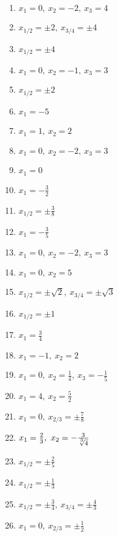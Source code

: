 \newpage
\begin{Answer}[ref=ganzNSTA1]\\
	\begin{minipage}{\textwidth}
		\begin{minipage}{0.49\textwidth}
			\begin{enumerate}[label=\alph*)]
				\item \(x_1=0,\ x_2=-2,\ x_3=4\)
				\item \(x_{1/2}=\pm 2,\ x_{3/4}=\pm 4\)
				\item \(x_{1/2}=\pm 4\)
				\item \(x_1=0,\ x_2=-1,\ x_3=3\)
				\item \(x_{1/2}=\pm 2\)
				\item \(x_1=-5\)
				\item \(x_1=1,\ x_2=2\)
				\item \(x_1=0,\ x_2=-2,\ x_3=3\)
				\item \(x_1=0\)
				\item \(x_1=-\frac{3}{2}\)
				\item \(x_{1/2}=\pm \frac{3}{8}\)
				\item \(x_1=-\frac{3}{5}\)
				\item \(x_1=0,\ x_2=-2,\ x_3=3\)
			\end{enumerate}
		\end{minipage}
		\begin{minipage}{0.49\textwidth}
			\begin{enumerate}[label=\alph*)]
				\setcounter{enumi}{13}
				\item \(x_1=0,\ x_2=5\)
				\item \(x_{1/2}=\pm \sqrt{2},\ x_{3/4}=\pm \sqrt{3}\)
				\item \(x_{1/2}=\pm 1\)
				\item \(x_1=\frac{3}{4}\)
				\item \(x_1=-1,\ x_2=2\)
				\item \(x_1=0,\ x_2=\frac{1}{4},\ x_3=-\frac{1}{5}\)
				\item \(x_1=4,\ x_2=\frac{5}{2}\)
				\item \(x_1=0,\ x_{2/3}=\pm \frac{7}{8}\)
				\item \(x_1=\frac{2}{3},\ x_2=-\frac{3}{\sqrt[\leftroot{0}\uproot{2}3]{4}}\)
				\item \(x_{1/2}=\pm\frac{2}{5}\)
				\item \(x_{1/2}=\pm\frac{1}{3}\)
				\item \(x_{1/2}=\pm\frac{3}{4},\ x_{3/4}=\pm\frac{4}{3}\)
				\item \(x_1=0,\ x_{2/3}=\pm\frac{1}{2}\)
			\end{enumerate}
		\end{minipage}
	\end{minipage}
\end{Answer}